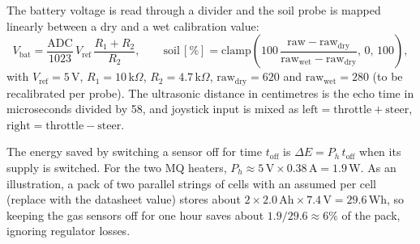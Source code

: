 The battery voltage is read through a divider and the soil probe is mapped linearly between a dry and a wet calibration value:
\begin{equation}
V_{\mathrm{bat}}=\frac{\mathrm{ADC}}{1023}\,V_{\mathrm{ref}}\,\frac{R_1+R_2}{R_2},\qquad
\mathrm{soil}\,[\%]=\mathrm{clamp}\!\left(100\,\frac{\mathrm{raw}-\mathrm{raw}_{\mathrm{dry}}}{\mathrm{raw}_{\mathrm{wet}}-\mathrm{raw}_{\mathrm{dry}}},\,0,\,100\right),
\label{eq:conversions}
\end{equation}
with $V_{\mathrm{ref}}=5$\,V, $R_1=10$\,k$\Omega$, $R_2=4.7$\,k$\Omega$, $\mathrm{raw}_{\mathrm{dry}}=620$ and $\mathrm{raw}_{\mathrm{wet}}=280$ (to be recalibrated per probe).
The ultrasonic distance in centimetres is the echo time in microseconds divided by 58, and joystick input is mixed as
$\mathrm{left}=\mathrm{throttle}+\mathrm{steer}$, $\mathrm{right}=\mathrm{throttle}-\mathrm{steer}$.

The energy saved by switching a sensor off for time $t_{\mathrm{off}}$ is $\Delta E=P_h\,t_{\mathrm{off}}$ when its supply is
switched. For the two MQ heaters, $P_h\approx 5\,\mathrm{V}\times 0.38\,\mathrm{A}=1.9$\,W. As an illustration, a pack of two parallel strings of cells with an
assumed  per cell (replace with the datasheet value) stores about $2\times2.0\,\mathrm{Ah}\times7.4\,\mathrm{V}=29.6$\,Wh, so
keeping the gas sensors off for one hour saves about $1.9/29.6\approx 6\%$ of the pack, ignoring regulator losses.
